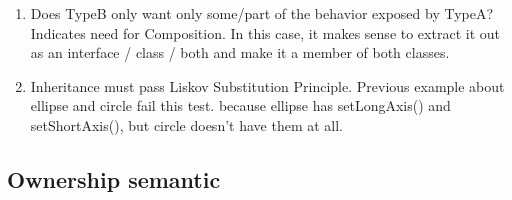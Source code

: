 \documentclass[a4paper,11pt,twoside]{book}
\begin{document}
\begin{itemize}
\begin{enumerate}
		\item Does TypeB only want only some/part of the behavior exposed by TypeA? Indicates need for Composition. In this case, it makes sense to extract it out as an interface / class / both and make it a member of both classes.
		
		\item Inheritance must pass Liskov Substitution Principle. Previous example about ellipse and circle fail this test. because ellipse has setLongAxis() and setShortAxis(), but circle doesn't have them at all.
	\end{enumerate}




\end{itemize}

\subsection{Ownership semantic}
\end{document}
